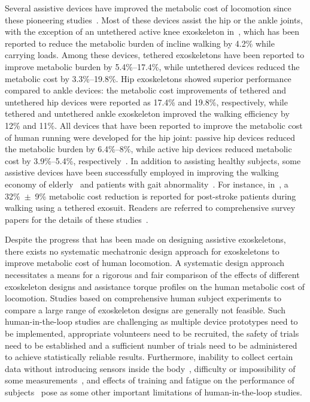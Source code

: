 \documentclass[10pt,letterpaper]{article}
\begin{document}
Several assistive devices have improved the metabolic cost of locomotion since these pioneering studies~\cite{Sawicki2020}. Most of these devices assist the hip or the ankle joints, with the exception of an untethered active knee exoskeleton in~\cite{Mhairi2019}, which has been reported to reduce the metabolic burden of incline walking by 4.2\% while carrying loads. Among these devices, tethered exoskeletons have been reported to improve metabolic burden by 5.4\%--17.4\%, while untethered devices reduced the metabolic cost by 3.3\%--19.8\%. Hip exoskeletons showed superior performance compared to ankle devices:  the metabolic cost improvements of tethered and untethered hip devices were reported as 17.4\% and 19.8\%, respectively, while tethered and untethered ankle exoskeleton improved the walking efficiency by 12\% and 11\%. All devices that have been reported to improve the metabolic cost of human running were developed for the hip joint: passive hip devices reduced the metabolic burden by 6.4\%--8\%, while active hip devices reduced metabolic cost by 3.9\%--5.4\%, respectively~\cite{Sawicki2020}. In addition to assisting healthy subjects, some assistive devices have been successfully employed in improving the walking economy of elderly~\cite{Kim2018_exo_elders,H_Lee_hipexo_elders} and patients with gait abnormality~\cite{Awad2017}. For instance, in~\cite{Awad2017},  a 32\%~$\pm$~9\% metabolic cost reduction is reported for post-stroke patients during walking using a tethered exosuit. Readers are referred to comprehensive survey papers for the details of these studies~\cite{Sawicki2020,Dollar2008,Young2017}.

Despite the progress that has been made on designing assistive exoskeletons, there exists no systematic mechatronic design approach for exoskeletons to improve metabolic cost of human locomotion. A systematic design approach necessitates a means for a rigorous and fair comparison of the effects of different exoskeleton designs and assistance torque profiles on the human metabolic cost of locomotion. Studies based on comprehensive human subject experiments to compare a large range of exoskeleton designs are generally not feasible. Such human-in-the-loop studies are challenging as multiple device prototypes need to be implemented,  appropriate volunteers need to be recruited, the safety of trials need to be established and a sufficient number of trials need to be administered to achieve statistically reliable results. Furthermore, inability to collect certain data without introducing sensors inside the body~\cite{Uchida2016_idealexo_running}, difficulty or impossibility of some measurements~\cite{Seth2018}, and effects of training and fatigue on the performance of subjects~\cite{Selinger2015,Gordon2007} pose as some other important limitations of human-in-the-loop studies.
\end{document}
